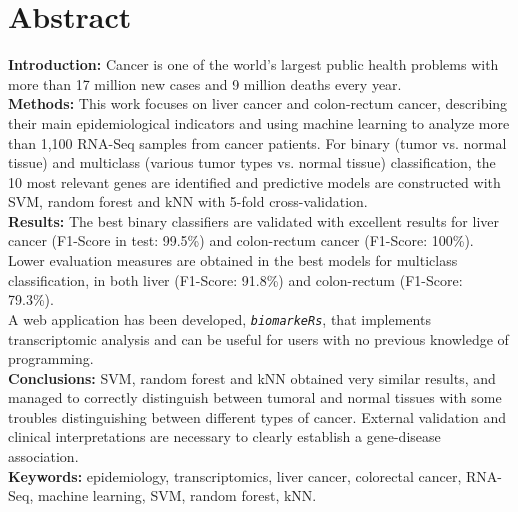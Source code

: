 \newpage
\thispagestyle{plain}

\section*{Abstract}

\textbf{Introduction:} Cancer is one of the world's largest public health problems with more than 17 million new cases and 9 million deaths every year. \\

\textbf{Methods:} This work focuses on liver cancer and colon-rectum cancer, describing their main epidemiological indicators and using machine learning to analyze more than 1,100 RNA-Seq samples from cancer patients. For binary (tumor vs. normal tissue) and multiclass (various tumor types vs. normal tissue) classification, the 10 most relevant genes are identified and predictive models are constructed with SVM, random forest and kNN with 5-fold cross-validation. \\

\textbf{Results:} The best binary classifiers are validated with excellent results for liver cancer (F1-Score in test: 99.5\%) and colon-rectum cancer (F1-Score: 100\%). Lower evaluation measures are obtained in the best models for multiclass classification, in both liver (F1-Score: 91.8\%) and colon-rectum (F1-Score: 79.3\%). \\

A web application has been developed, \texttt{\textit{biomarkeRs}}, that implements transcriptomic analysis and can be useful for users with no previous knowledge of programming. \\

\textbf {Conclusions:} SVM, random forest and kNN obtained very similar results, and managed to correctly distinguish between tumoral and normal tissues with some troubles distinguishing between different types of cancer. External validation and clinical interpretations are necessary to clearly establish a gene-disease association.\\

\textbf{Keywords:} epidemiology, transcriptomics, liver cancer, colorectal cancer, RNA-Seq, machine learning, SVM, random forest, kNN.

\newpage
\thispagestyle{empty}

